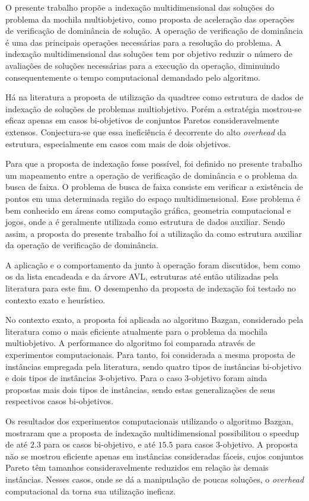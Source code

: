 O presente trabalho propõe a indexação multidimensional das soluções
do problema da mochila multiobjetivo,
como proposta de aceleração das operações de verificação de dominância de solução.
A operação de verificação de dominância é uma das principais
operações necessárias para a resolução do problema.
A indexação multidimensional das soluções tem por objetivo
reduzir o número de avaliações de soluções necessárias para a execução da operação,
diminuindo consequentemente o tempo computacional
demandado pelo algoritmo.

Há na literatura a proposta de utilização da quadtree como estrutura de dados
de indexação de soluções de problemas multiobjetivo.
Porém a estratégia mostrou-se eficaz apenas em casos bi-objetivos de conjuntos Paretos consideravelmente extensos.
Conjectura-se que essa ineficiência é decorrente
do alto \emph{overhead} da estrutura, especialmente em casos com mais de dois objetivos.

Para que a proposta de indexação fosse possível,
foi definido no presente trabalho um mapeamento entre a operação
de verificação de dominância e o problema da busca de faixa.
O problema de busca de faixa consiste em verificar a existência de pontos em uma determinada
região do espaço multidimensional.
Esse problema é bem conhecido em áreas como computação gráfica, geometria computacional e jogos,
onde a \kdtree{} é geralmente utilizada como estrutura de dados auxiliar.
Sendo assim, a proposta do presente trabalho foi a utilização da \kdtree{}
como estrutura auxiliar da operação de verificação de dominância.

A aplicação e o comportamento da \kdtree{} junto à operação
foram discutidos, bem como os da lista encadeada e da árvore AVL,
estruturas até então utilizadas pela literatura para este fim.
O desempenho da proposta de indexação foi testado no contexto exato e heurístico.

No contexto exato, a proposta foi aplicada ao algoritmo Bazgan,
considerado pela literatura como o mais eficiente atualmente para o problema da mochila multiobjetivo.
A performance do algoritmo foi comparada através de experimentos computacionais.
Para tanto, foi considerada a mesma proposta de instâncias empregada pela literatura,
sendo quatro tipos de instâncias bi-objetivo e dois tipos de instâncias 3-objetivo.
Para o caso 3-objetivo foram ainda propostas mais dois tipos de instâncias,
sendo estas generalizações de seus respectivos casos bi-objetivos.

Os resultados dos experimentos computacionais utilizando o algoritmo Bazgan,
mostraram que a proposta de indexação multidimensional possibilitou o speedup
de até $2.3$ para os casos bi-objetivo, e até $15.5$ para casos 3-objetivo.
A proposta não se mostrou eficiente apenas em instâncias consideradas fáceis,
cujos conjuntos Pareto têm tamanhos consideravelmente reduzidos em relação
às demais instâncias.
Nesses casos, onde se dá a manipulação de poucas soluções,
o \emph{overhead} computacional da \kdtree{} torna sua utilização ineficaz.

